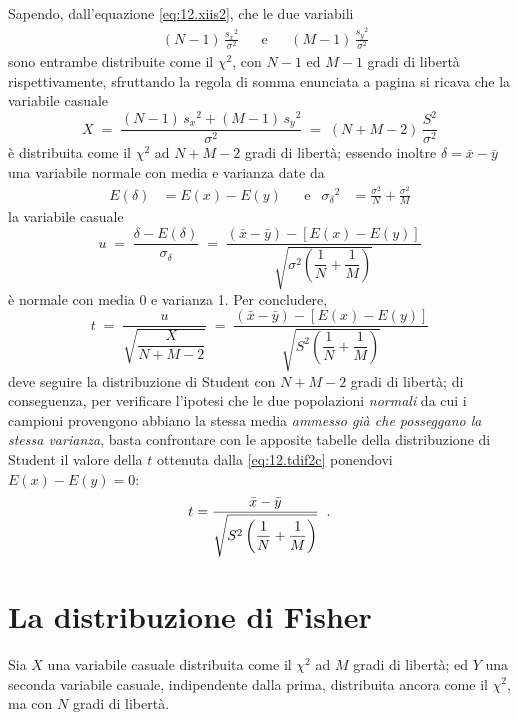 Sapendo, dall'equazione \eqref{eq:12.xiis2}, che le due
variabili
\begin{align*}
  &(N-1) \, \frac{{s_x}^2}{\sigma^2} &&\text{e}
    &&(M-1)\, \frac{{s_y}^2}{\sigma^2}
\end{align*}
sono entrambe distribuite come il $\chi^2$, con $N - 1$ ed
$M - 1$ gradi di libert\`a rispettivamente, sfruttando la
regola di somma enunciata a pagina \pageref{th:12.resochi}
si ricava che la variabile casuale
\begin{equation*}
  X \; = \; \frac{(N-1) \, {s_x}^2 + (M-1) \,
    {s_y}^2}{\sigma^2} \; = \; (N + M - 2) \,
    \frac{S^2}{\sigma^2}
\end{equation*}
\`e distribuita come il $\chi^2$ ad $N + M - 2$ gradi di
libert\`a; essendo inoltre $\delta = \bar x - \bar y$ una
variabile normale con media e varianza date da
\begin{align*}
  E(\delta) &= E(x) - E(y) &&\text{e}
    &{\sigma_\delta}^2 &= \frac{\sigma^2}{N} +
    \frac{\sigma^2}{M}
\end{align*}
la variabile casuale
\begin{equation*}
  u \; = \; \frac{\delta - E(\delta)}{\sigma_\delta} \;
    = \; \frac{(\bar x - \bar y) - \left[ E(x) - E(y)
    \right]}{\sqrt{{\sigma}^2 \left( \dfrac{1}{N} +
    \dfrac{1}{M} \right)}}
\end{equation*}
\`e normale con media 0 e varianza 1.  Per concludere,
\begin{equation} \label{eq:12.tdif2c}
  t \; = \; \frac{u}{\sqrt{\dfrac{X}{N+M-2}}} \; = \;
    \frac{(\bar x - \bar y) - \left[ E(x) - E(y)
    \right]}{\sqrt{S^2 \left( \dfrac{1}{N} +
    \dfrac{1}{M} \right)}}
\end{equation}
deve seguire la distribuzione di Student%
con $N + M - 2$ gradi di libert\`a; di conseguenza, per
verificare l'ipotesi che le due popolazioni \emph{normali}
da cui i campioni provengono abbiano la stessa media
\emph{ammesso gi\`a che posseggano la stessa varianza},
basta confrontare con le apposite tabelle della
distribuzione di Student il valore della $t$ ottenuta dalla
\eqref{eq:12.tdif2c} ponendovi $E(x) - E(y) = 0$:
\begin{equation*}
  t = \frac{\bar x - \bar y}{\sqrt{S^2 \left(
    \dfrac{1}{N} + \dfrac{1}{M} \right)} } \;\; .
\end{equation*}%
%

\section{La distribuzione di Fisher}%
Sia $X$ una variabile casuale distribuita come il $\chi^2$
ad $M$ gradi di libert\`a; ed $Y$ una seconda variabile
casuale, indipendente dalla prima, distribuita ancora come
il $\chi^2$, ma con $N$ gradi di libert\`a.


